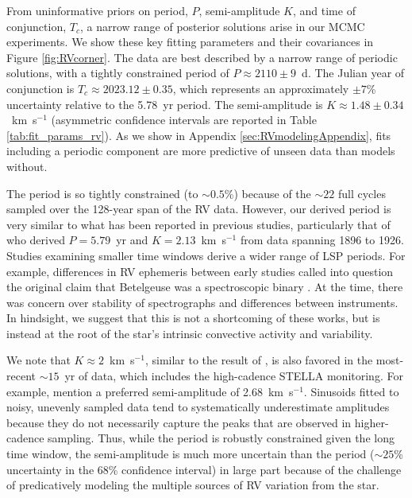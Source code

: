 \documentclass[twocolumn]{aastex631}
\begin{document}
From uninformative priors on period, $P$, semi-amplitude $K$, and time of conjunction, $T_c$, a narrow range of posterior solutions arise in our MCMC experiments. We show these key fitting parameters and their covariances in Figure \ref{fig:RVcorner}. The data are best described by a narrow range of periodic solutions, with a tightly constrained period of $P\approx 2110 \pm 9$~d. The Julian year of conjunction is $T_c \approx 2023.12 \pm 0.35$, which represents an approximately $\pm 7$\% uncertainty relative to the 5.78~yr period. The semi-amplitude is $K\approx 1.48 \pm 0.34$~km~s$^{-1}$ (asymmetric confidence intervals are reported in Table \ref{tab:fit_params_rv}).   As we show in Appendix \ref{sec:RVmodelingAppendix}, fits including a periodic component are more predictive of unseen data than models without. 

The period is so tightly constrained (to $\sim 0.5$\%) because of the $\sim 22$ full cycles sampled over the 128-year span of the RV data. However, our derived period is very similar to what has been reported in previous studies, particularly that of \citet{1928MNRAS..88..660S} who derived $P=5.79$~yr and $K=2.13$~km~s$^{-1}$ from data spanning 1896 to 1926. Studies examining smaller time windows derive a wider range of LSP periods. For example, differences in RV ephemeris between early studies called into question the original claim that Betelgeuse was a spectroscopic binary \citep[e.g.][]{1908PASP...20..227P,1908ApJ....27..301K,1911AN....187...33B,1916ApJ....44..250L,1928MNRAS..88..660S,1933ApJ....77..110S}. At the time, there was concern over stability of spectrographs and differences between instruments. In hindsight, we suggest that this is not a shortcoming of these works, but is instead at the root of the star's intrinsic convective activity and variability. 

We note that $K\approx 2$~km~s$^{-1}$, similar to the result of \citet{1928MNRAS..88..660S},  is also favored in the most-recent $\sim 15$~yr of data, which includes the high-cadence STELLA monitoring. For example, \citet{2022csss.confE.185G} mention a preferred semi-amplitude of 2.68~km~s$^{-1}$. Sinusoids fitted to noisy, unevenly sampled data tend to systematically underestimate amplitudes because they do not necessarily capture the peaks that are observed in higher-cadence sampling.  Thus, while the period is robustly constrained given the long time window, the semi-amplitude is much more uncertain than the period ($\sim 25$\% uncertainty in the 68\% confidence interval) in large part because of the challenge of predicatively modeling the multiple sources of RV variation from the star. 
\end{document}
